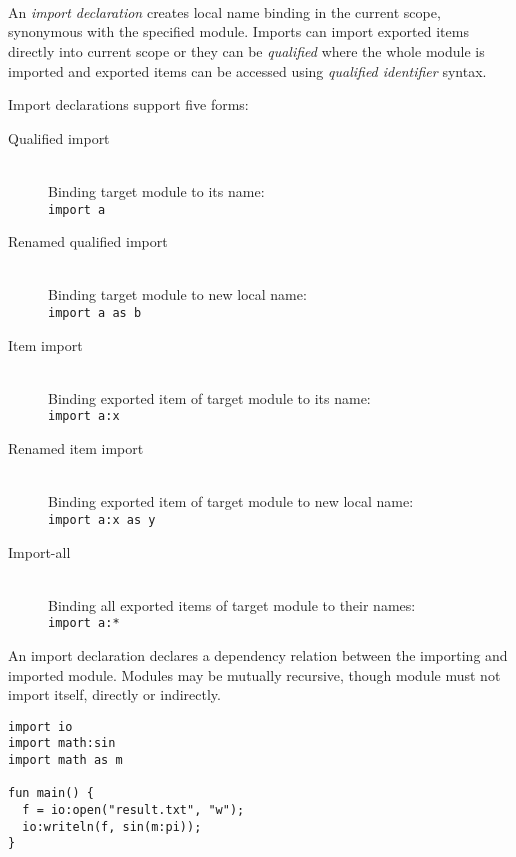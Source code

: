 \begin{bnf}
   \eq {} \  \\
  \\
   \eq    {} 
                  \gorln {} \  \  
                  \gorln {} \ \term{:} \  
                  \gorln {} \ \term{:} \  \  \  
                  \gorln {} \ \term{:} \ \term{*} 
\end{bnf}

An \emph{import declaration} creates local name binding in the current scope, synonymous with the specified module. Imports can import exported items directly into current scope or they can be \emph{qualified} where the whole module is imported and exported items can be accessed using \emph{qualified identifier} syntax.

Import declarations support five forms:

\begin{description}
  \item [Qualified import] \hfill \\
    Binding target module to its name: \\
    \lstinline{import a}
  \item [Renamed qualified import] \hfill \\
    Binding target module to new local name: \\
    \lstinline{import a as b}
  \item [Item import] \hfill \\
    Binding exported item of target module to its name: \\
    \lstinline{import a:x}
  \item [Renamed item import] \hfill \\
    Binding exported item of target module to new local name: \\
    \lstinline{import a:x as y}
  \item [Import-all] \hfill \\
    Binding all exported items of target module to their names: \\
    \lstinline{import a:*}
\end{description}

An import declaration declares a dependency relation between the importing and imported module. Modules may be mutually recursive, though module must not import itself, directly or indirectly.

\begin{example}
\begin{lstlisting}[language=intentio]
import io
import math:sin
import math as m

fun main() {
  f = io:open("result.txt", "w");
  io:writeln(f, sin(m:pi));
}
\end{lstlisting}
\end{example}
